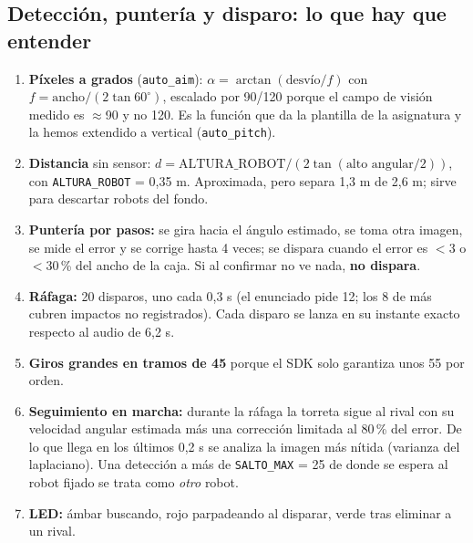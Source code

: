 \documentclass[11pt,a4paper]{article}
\newcommand{\cod}[1]{\texttt{#1}}
\newcommand{\gr}{\textdegree{}}
\begin{document}
\subsection{Detección, puntería y disparo: lo que hay que entender}
\begin{enumerate}
  \item \textbf{Píxeles a grados} (\cod{auto\_\allowbreak{}aim}): $\alpha = \arctan(\text{desvío}/f)$ con $f = \text{ancho}/(2\tan 60^\circ)$, escalado por 90/120 porque el campo de visión medido es $\approx$90\gr{} y no 120\gr. Es la función que da la plantilla de la asignatura y la hemos extendido a vertical (\cod{auto\_\allowbreak{}pitch}).
  \item \textbf{Distancia} sin sensor: $d = \text{ALTURA\_ROBOT} / (2\tan(\text{alto angular}/2))$, con \cod{ALTURA\_\allowbreak{}ROBOT} = 0,35 m. Aproximada, pero separa 1,3 m de 2,6 m; sirve para descartar robots del fondo.
  \item \textbf{Puntería por pasos:} se gira hacia el ángulo estimado, se toma otra imagen, se mide el error y se corrige hasta 4 veces; se dispara cuando el error es $<$3\gr{} o $<$30\,\% del ancho de la caja. Si al confirmar no ve nada, \textbf{no dispara}.
  \item \textbf{Ráfaga:} 20 disparos, uno cada 0,3 s (el enunciado pide 12; los 8 de más cubren impactos no registrados). Cada disparo se lanza en su instante exacto respecto al audio de 6,2 s.
  \item \textbf{Giros grandes en tramos de 45\gr} porque el SDK solo garantiza unos 55\gr{} por orden.
  \item \textbf{Seguimiento en marcha:} durante la ráfaga la torreta sigue al rival con su velocidad angular estimada más una corrección limitada al 80\,\% del error. De lo que llega en los últimos 0,2 s se analiza la imagen más nítida (varianza del laplaciano). Una detección a más de \cod{SALTO\_\allowbreak{}MAX} = 25\gr{} de donde se espera al robot fijado se trata como \emph{otro} robot.
  \item \textbf{LED:} ámbar buscando, rojo parpadeando al disparar, verde tras eliminar a un rival.
\end{enumerate}
\end{document}
